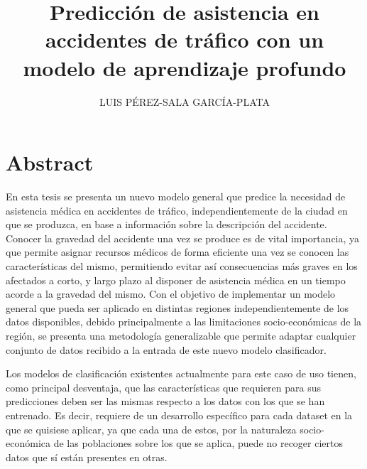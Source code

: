 \documentclass{uathesis-es}
\title{Predicción de asistencia en accidentes de tráfico con un modelo de aprendizaje profundo}
\author{LUIS PÉREZ-SALA GARCÍA-PLATA}
\begin{document}
\maketitle

\listoffigures
\listoftables

\tableofcontents



\chapter*{Abstract}





En esta tesis se presenta un nuevo modelo general que predice la necesidad de asistencia médica en accidentes de tráfico, independientemente de la ciudad en que se produzca, en base a información sobre la descripción del accidente. Conocer la gravedad del accidente una vez se produce es de vital importancia, ya que permite asignar recursos médicos de forma eficiente una vez se conocen las características del mismo, permitiendo evitar así consecuencias más graves en los afectados a corto, y largo plazo al disponer de asistencia médica en un tiempo acorde a la gravedad del mismo. Con el objetivo de implementar un modelo general que pueda ser aplicado en distintas regiones independientemente de los datos disponibles, debido principalmente a las limitaciones socio-económicas de la región, se presenta una metodología generalizable que permite adaptar cualquier conjunto de datos recibido a la entrada de este nuevo modelo clasificador.

Los modelos de clasificación existentes actualmente para este caso de uso tienen, como principal desventaja, que las características que requieren para sus predicciones deben ser las mismas respecto a los datos con los que se han entrenado. 
Es decir, requiere de un desarrollo específico para cada dataset en la que se quisiese aplicar, ya que cada una de estos, por la naturaleza socio-económica de las poblaciones sobre los que se aplica, puede no recoger ciertos datos que sí están presentes en otras. 
\end{document}
